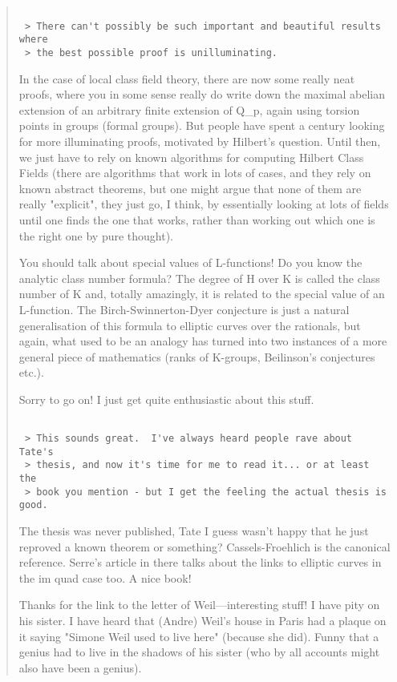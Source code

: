 \begin{quote}
\begin{verbatim}

 > There can't possibly be such important and beautiful results where 
 > the best possible proof is unilluminating.
\end{verbatim}
    

 In the case of local class field theory, there are now some really
 neat proofs, where you in some sense really do write down the maximal
 abelian extension of an arbitrary finite extension of Q_{p}, 
 again using torsion
 points in groups (formal groups). But people have spent a century looking
 for more illuminating proofs, motivated by Hilbert's question.
 Until then, we just have to rely on known algorithms for computing
 Hilbert Class Fields (there are algorithms that work in lots of cases,
 and they rely on known abstract theorems, but one might argue that
 none of them are really "explicit", they just go, I think, by essentially
 looking at lots of fields until one finds the one that works, rather than
 working out which one is the right one by pure thought).

 You should talk about special values of L-functions! Do you know the
 analytic class number formula? The degree of H over K is called the
 class number of K and, totally amazingly, it is related to the special
 value of an L-function. The Birch-Swinnerton-Dyer conjecture is just
 a natural generalisation of this formula to elliptic curves over the
 rationals, but again, what used to be an analogy has turned into two
 instances of a more general piece of mathematics (ranks of K-groups,
 Beilinson's conjectures etc.).

 Sorry to go on! I just get quite enthusiastic about this stuff.


\begin{verbatim}

 > This sounds great.  I've always heard people rave about Tate's 
 > thesis, and now it's time for me to read it... or at least the 
 > book you mention - but I get the feeling the actual thesis is good.
\end{verbatim}
    

 The thesis was never published, Tate I guess wasn't happy that he just
 reproved a known theorem or something? Cassels-Froehlich is the canonical
 reference. Serre's article in there talks about the links to elliptic
 curves in the im quad case too. A nice book! 

 Thanks for the link to the letter of Weil---interesting stuff! I have
 pity on his sister. I have heard that (Andre) Weil's house in Paris had a
 plaque on it saying "Simone Weil used to live here" (because she did).
 Funny that a genius had to live in the shadows of his sister (who by
 all accounts might also have been a genius).


\end{quote}
